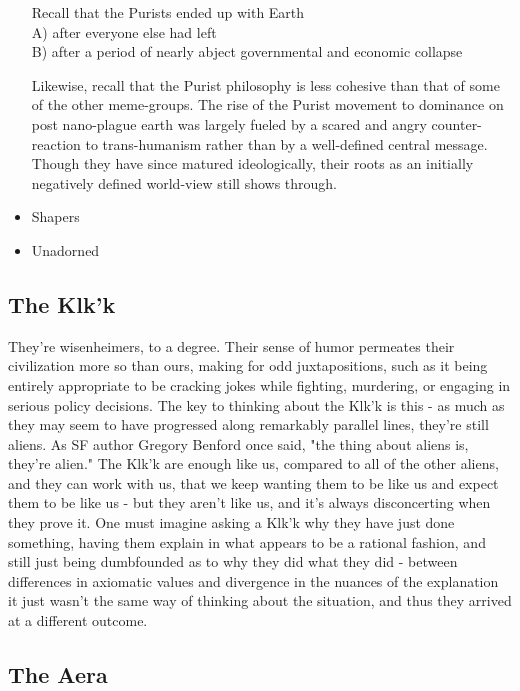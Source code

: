 \begin{itemize}
Recall that the Purists ended up with Earth\\
A) after everyone else had left\\
B) after a period of nearly abject governmental and economic collapse

Likewise, recall that the Purist philosophy is less cohesive than that
of some of the other meme-groups. The rise of the Purist movement to
dominance on post nano-plague earth was largely fueled by a scared and
angry counter-reaction to trans-humanism rather than by a well-defined
central message. Though they have since matured ideologically, their
roots as an initially negatively defined world-view still shows
through.

\item Shapers
\item Unadorned
\end{itemize}

\subsection{The Klk'k}

They're wisenheimers, to a degree. Their sense of humor permeates
their civilization more so than ours, making for odd juxtapositions,
such as it being entirely appropriate to be cracking jokes while
fighting, murdering, or engaging in serious policy decisions. The key
to thinking about the Klk'k is this - as much as they may seem to have
progressed along remarkably parallel lines, they're still aliens. As
SF author Gregory Benford once said, "the thing about aliens is,
they're alien." The Klk'k are enough like us, compared to all of the
other aliens, and they can work with us, that we keep wanting them to
be like us and expect them to be like us - but they aren't like us,
and it's always disconcerting when they prove it. One must imagine
asking a Klk'k why they have just done something, having them explain
in what appears to be a rational fashion, and still just being
dumbfounded as to why they did what they did - between differences in
axiomatic values and divergence in the nuances of the explanation it
just wasn't the same way of thinking about the situation, and thus
they arrived at a different outcome.

\subsection{The Aera}

